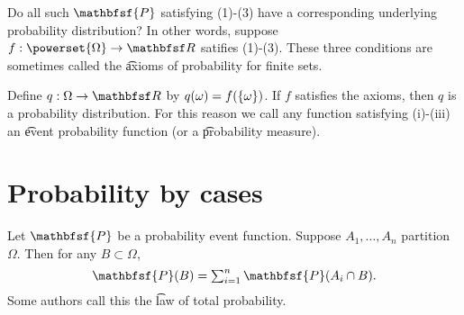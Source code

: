 Do all such $\mathbfsf{P} $ satisfying (1)-(3) have a corresponding underlying probability distribution?
In other words, suppose $f: \powerset{\Omega } \to \R $ satifies (1)-(3).
These three conditions are sometimes called the \t{axioms of probability for finite sets}.

Define $q: \Omega  \to \R $ by $q(\omega ) = f(\{\omega \})$.
If $f$ satisfies the axioms, then $q$ is a probability distribution.
For this reason we call any function satisfying (i)-(iii) an \t{event probability function} (or a \t{probability measure}).

\section*{Probability by cases}

Let $\mathbfsf{P} $ be a probability event function.
Suppose $A_1, \dots , A_n$ partition $\Omega $.
Then for any $B \subset \Omega $,
    \[
\textstyle
\mathbfsf{P} (B) = \sum_{i = 1}^{n} \mathbfsf{P} (A_i \cap  B).
    \]
Some authors call this the \t{law of total probability}.
